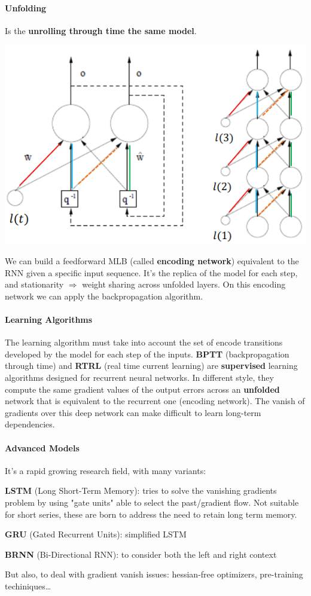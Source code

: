 \documentclass[10pt]{report}
\begin{document}
\paragraph{Unfolding} Is the \textbf{unrolling through time the same model}.
\begin{center}
	\includegraphics[scale=0.5]{38.png}
\end{center}
We can build a feedforward MLB (called \textbf{encoding network}) equivalent to the RNN given a specific input sequence. It's the replica of the model for each step, and stationarity $\Rightarrow$ weight sharing across unfolded layers. On this encoding network we can apply the backpropagation algorithm.
\paragraph{Learning Algorithms} The learning algorithm must take into account the set of encode transitions developed by the model for each step of the inputs. \textbf{BPTT} (backpropagation through time) and \textbf{RTRL} (real time current learning) are \textbf{supervised} learning algorithms designed for recurrent neural networks. In different style, they compute the same gradient values of the output errors across an \textbf{unfolded} network that is equivalent to the recurrent one (encoding network). The vanish of gradients over this deep network can make difficult to learn long-term dependencies.
\paragraph{Advanced Models} It's a rapid growing research field, with many variants:
\begin{list}{}{}
	\item \textbf{LSTM} (Long Short-Term Memory): tries to solve the vanishing gradients problem by using "gate units" able to select the past/gradient flow. Not suitable for short series, these are born to address the need to retain long term memory.
	\item \textbf{GRU} (Gated Recurrent Units): simplified LSTM
	\item \textbf{BRNN} (Bi-Directional RNN): to consider both the left and right context
	\item But also, to deal with gradient vanish issues: hessian-free optimizers, pre-training techiniques\ldots
\end{list}
\end{document}
